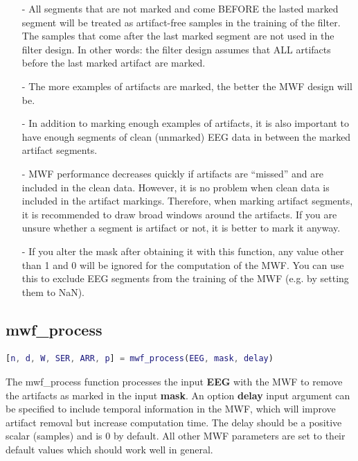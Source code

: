 \documentclass[11pt]{article}
\begin{document}
\begin{itemize}[noitemsep]
\item[-] All segments that are not marked and come BEFORE the lasted marked segment will be treated as artifact-free samples in the training of the filter. The samples that come after the last marked segment are not used in the filter design. In other words: the filter design assumes that ALL artifacts before the last marked artifact are marked.
\item[-] The more examples of artifacts are marked, the better the MWF design will be.
\item[-] In addition to marking enough examples of artifacts, it is also important to have enough segments of clean (unmarked) EEG data in between the marked artifact  segments.
\item[-] MWF performance decreases quickly if artifacts are ``missed'' and are included in the clean data. However, it is no problem when clean data is included in the artifact markings. Therefore, when marking artifact segments, it is recommended to draw broad windows around the artifacts. If you are unsure whether a segment is artifact or not, it is better to mark it anyway.
\item[-] If you alter the mask after obtaining it with this function, any value other than 1 and 0 will be ignored for the computation of the MWF. You can use this to exclude EEG segments from the training of the MWF (e.g. by setting them to NaN).
\end{itemize}
\vspace{10mm}

\subsection{mwf\_process}

\begin{lstlisting}[frame=single, language=matlab]
[n, d, W, SER, ARR, p] = mwf_process(EEG, mask, delay)
\end{lstlisting}

The mwf\_process function processes the input \textbf{EEG} with the MWF to remove the artifacts as marked in the input \textbf{mask}. An option \textbf{delay} input argument can be specified to include temporal information in the MWF, which will improve artifact removal but increase computation time. The delay should be a positive scalar (samples) and is 0 by default. All other MWF parameters are set to their default values which should work well in general.
\end{document}

